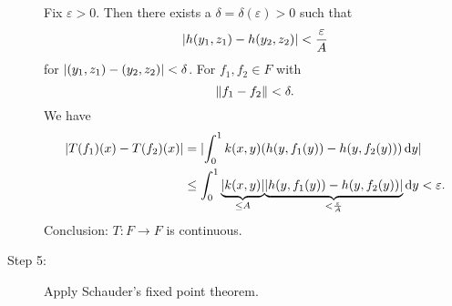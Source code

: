 \begin{beispiel}
\begin{description}
	Fix $\varepsilon >0$. Then there exists a $\delta = \delta (\varepsilon) >0$ such that
	\[
		\lvert h(y_1,z_1)-h(y_2,z_2)\rvert < \frac{\varepsilon}{A}
	\] 
	for $\lvert(y_1,z_1)-(y_2,z_2)\rvert < \delta $. For $f_1,f_2 \in F$ with
	\[
		\norm{f_1-f_2} < \delta.
	\]
	We have 
	\begin{align*}
		\lvert T(f_1)(x)-T(f_2)(x)\rvert &= \lvert\int_{0}^{1}k(x,y)(h(y,f_1(y))-h(y,f_2(y))) \,\mathrm{d}y\rvert \\
		&\leq  \int_{0}^{1}\underset{\leq A}{\underbrace{\lvert k(x,y)\rvert}}\underset{< \frac{\varepsilon}{A}}{\underbrace{\lvert h(y,f_1(y))-h(y,f_2(y))\rvert}} \,\mathrm{d}y < \varepsilon.
	\end{align*}
	Conclusion: $T: F \to F$ is continuous. 
	\item[Step 5:] Apply Schauder's fixed point theorem.
	\end{description}
\end{beispiel}
